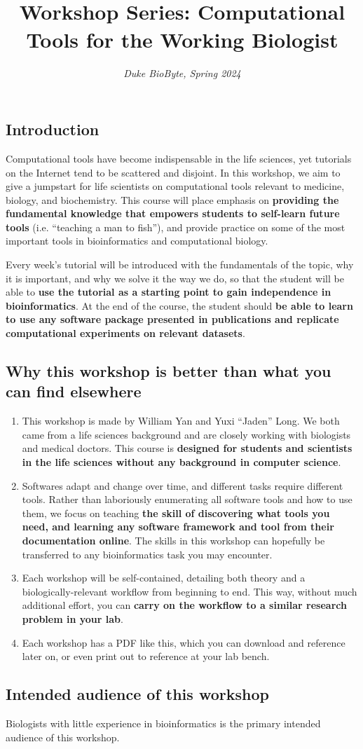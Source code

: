 \documentclass[12pt,letterpaper]{article}
\title{\textbf{\\Workshop Series: Computational Tools for the Working Biologist}}
\author{\textit{Duke BioByte, Spring 2024}}
\date{}
\begin{document}
\maketitle

\thispagestyle{empty}

\subsection{Introduction}

Computational tools have become indispensable in the life sciences, yet tutorials on the Internet tend to be scattered and disjoint. In this workshop, we aim to give a jumpstart for life scientists on computational tools relevant to medicine, biology, and biochemistry. This course will place emphasis on \textbf{providing the fundamental knowledge that empowers students to self-learn future tools} (i.e. “teaching a man to fish”), and provide practice on some of the most important tools in bioinformatics and computational biology.

Every week's tutorial will be introduced with the fundamentals of the topic, why it is important, and why we solve it the way we do, so that the student will be able to \textbf{use the tutorial as a starting point to gain independence in bioinformatics}. At the end of the course, the student should \textbf{be able to learn to use any software package presented in publications and replicate computational experiments on relevant datasets}.


\subsection{Why this workshop is better than what you can find elsewhere}

\begin{enumerate}
   \item This workshop is made by William Yan and Yuxi ``Jaden'' Long. We both came from a life sciences background and are closely working with biologists and medical doctors. This course is \textbf{designed for students and scientists in the life sciences without any background in computer science}.
   \item Softwares adapt and change over time, and different tasks require different tools. Rather than laboriously enumerating all software tools and how to use them, we focus on teaching \textbf{the skill of discovering what tools you need, and learning any software framework and tool from their documentation online}. The skills in this workshop can hopefully be transferred to any bioinformatics task you may encounter.
   \item Each workshop will be self-contained, detailing both theory and a biologically-relevant workflow from beginning to end. This way, without much additional effort, you can \textbf{carry on the workflow to a similar research problem in your lab}.
   \item Each workshop has a PDF like this, which you can download and reference later on, or even print out to reference at your lab bench.
\end{enumerate}

\subsection{Intended audience of this workshop}

Biologists with little experience in bioinformatics is the primary intended audience of this workshop.
\end{document}
